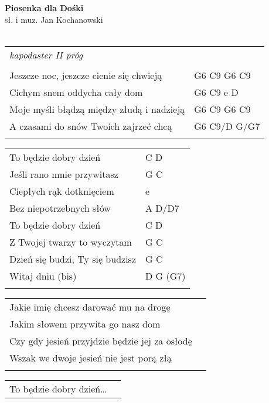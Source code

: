 \documentclass[a5paper]{article}
\begin{document}


\noindent
\fontsize{12pt}{15pt}\selectfont
\textbf{Piosenka dla Dośki} \\
\fontsize{8pt}{10pt}\selectfont
sł. i muz. Jan Kochanowski \\ \\
\fontsize{10pt}{12pt}\selectfont
{}
\begin{tabular}{@{}p{7.50cm}p{3cm}@{}}
\noindent
\emph{kapodaster II próg} \\ \\

Jeszcze noc, jeszcze cienie się chwieją & G6 C9 G6 C9 \\
Cichym snem oddycha cały dom & G6 C9 e D \\
Moje myśli błądzą między złudą i nadzieją & G6 C9 G6 C9 \\
A czasami do snów Twoich zajrzeć chcą & G6 C9/D G/G7 \\ \\
\end{tabular}

\noindent
\begin{tabular}{@{}p{6.50cm}p{3cm}@{}}
To będzie dobry dzień & C D \\
Jeśli rano mnie przywitasz & G C \\
Ciepłych rąk dotknięciem & e \\
Bez niepotrzebnych słów & A D/D7 \\
To będzie dobry dzień & C D  \\
Z Twojej twarzy to wyczytam & G C \\
Dzień się budzi, Ty się budzisz & G C \\
Witaj dniu (bis) & D G (G7) \\ \\
\end{tabular}
  
\noindent
\begin{tabular}{@{}p{7.50cm}p{3cm}@{}}
Jakie imię chcesz darować mu na drogę \\
Jakim słowem przywita go nasz dom \\
Czy gdy jesień przyjdzie będzie jej za osłodę \\
Wszak we dwoje jesień nie jest porą złą \\ \\
\end{tabular}

\noindent
\begin{tabular}{@{}p{7.50cm}p{3cm}@{}}
To będzie dobry dzień…
\end{tabular}
\end{document}
